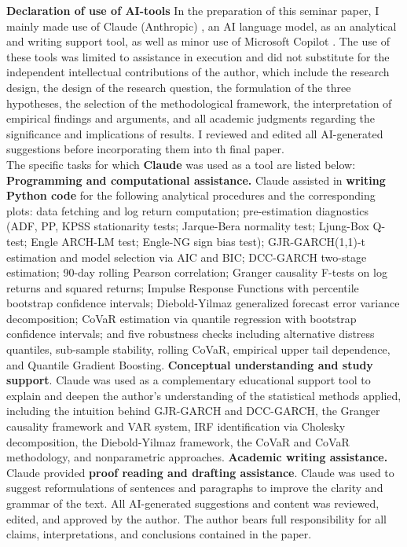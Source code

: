 \documentclass[12pt,a4paper,titlepage,oneside,english]{article}
\begin{document}
\textbf{Declaration of use of AI-tools}
In the preparation of this seminar paper, I mainly made use of Claude (Anthropic) \parencite{claude_sonnet_2025}, an AI language model, as an analytical and writing support tool, as well as minor use of Microsoft Copilot \parencite{microsoftcopilot2026}. The use of these tools was limited to assistance in execution and did not substitute for the independent intellectual contributions of the author, which include the research design, the design of the research question, the formulation of the three hypotheses, the selection of the methodological framework, the interpretation of empirical findings and arguments, and all academic judgments regarding the significance and implications of results. I reviewed and edited all AI-generated suggestions before incorporating them into th final paper.\\
The specific tasks for which \textbf{Claude} was used as a tool are listed below:
\textbf{Programming and computational assistance.} Claude assisted in \textbf{writing Python code} for the following analytical procedures and the corresponding plots: data fetching and log return computation; pre-estimation diagnostics (ADF, PP, KPSS stationarity tests; Jarque-Bera normality test; Ljung-Box Q-test; Engle ARCH-LM test; Engle-NG sign bias test); GJR-GARCH(1,1)-t estimation and model selection via AIC and BIC; DCC-GARCH two-stage estimation; 90-day rolling Pearson correlation; Granger causality F-tests on log returns and squared returns; Impulse Response Functions with percentile bootstrap confidence intervals; Diebold-Yilmaz generalized forecast error variance decomposition; CoVaR estimation via quantile regression with bootstrap confidence intervals; and five robustness checks including alternative distress quantiles, sub-sample stability, rolling CoVaR, empirical upper tail dependence, and Quantile Gradient Boosting.
\textbf{Conceptual understanding and study support}. Claude was used as a complementary educational support tool to explain and deepen the author's understanding of the statistical methods applied, including the intuition behind GJR-GARCH and DCC-GARCH, the Granger causality framework and VAR system, IRF identification via Cholesky decomposition, the Diebold-Yilmaz framework, the CoVaR and CoVaR methodology, and nonparametric approaches.
\textbf{Academic writing assistance.} Claude provided \textbf{proof reading and drafting assistance}. Claude was used to suggest reformulations of sentences and paragraphs to improve the clarity and grammar of the text. All AI-generated suggestions and content was reviewed, edited, and approved by the author. The author bears full responsibility for all claims, interpretations, and conclusions contained in the paper.
\end{document}
